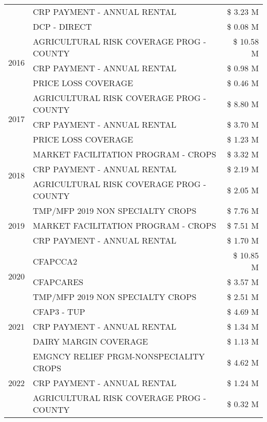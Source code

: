 \begin{tabular}{llr}
 & CRP PAYMENT - ANNUAL RENTAL & \$ 3.23 M \\
 & DCP - DIRECT & \$ 0.08 M \\
\cline{1-3}
\multirow[t]{3}{*}{2016} & AGRICULTURAL RISK COVERAGE PROG - COUNTY & \$ 10.58 M \\
 & CRP PAYMENT - ANNUAL RENTAL & \$ 0.98 M \\
 & PRICE LOSS COVERAGE & \$ 0.46 M \\
\cline{1-3}
\multirow[t]{3}{*}{2017} & AGRICULTURAL RISK COVERAGE PROG - COUNTY & \$ 8.80 M \\
 & CRP PAYMENT - ANNUAL RENTAL & \$ 3.70 M \\
 & PRICE LOSS COVERAGE & \$ 1.23 M \\
\cline{1-3}
\multirow[t]{3}{*}{2018} & MARKET FACILITATION PROGRAM - CROPS & \$ 3.32 M \\
 & CRP PAYMENT - ANNUAL RENTAL & \$ 2.19 M \\
 & AGRICULTURAL RISK COVERAGE PROG - COUNTY & \$ 2.05 M \\
\cline{1-3}
\multirow[t]{3}{*}{2019} & TMP/MFP 2019 NON SPECIALTY CROPS & \$ 7.76 M \\
 & MARKET FACILITATION PROGRAM - CROPS & \$ 7.51 M \\
 & CRP PAYMENT - ANNUAL RENTAL & \$ 1.70 M \\
\cline{1-3}
\multirow[t]{3}{*}{2020} & CFAPCCA2 & \$ 10.85 M \\
 & CFAPCARES & \$ 3.57 M \\
 & TMP/MFP 2019 NON SPECIALTY CROPS & \$ 2.51 M \\
\cline{1-3}
\multirow[t]{3}{*}{2021} & CFAP3 - TUP & \$ 4.69 M \\
 & CRP PAYMENT - ANNUAL RENTAL & \$ 1.34 M \\
 & DAIRY MARGIN COVERAGE & \$ 1.13 M \\
\cline{1-3}
\multirow[t]{3}{*}{2022} & EMGNCY RELIEF PRGM-NONSPECIALITY CROPS & \$ 4.62 M \\
 & CRP PAYMENT - ANNUAL RENTAL & \$ 1.24 M \\
 & AGRICULTURAL RISK COVERAGE PROG - COUNTY & \$ 0.32 M \\
\cline{1-3}
\bottomrule
\end{tabular}
